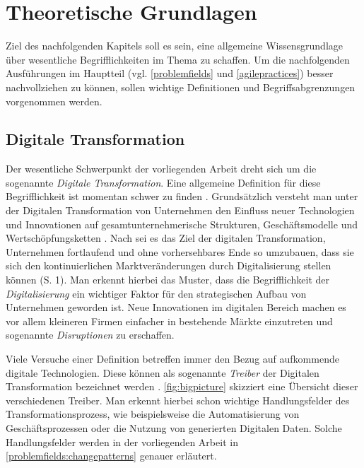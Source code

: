 \chapter{Theoretische Grundlagen}
\label{background}


Ziel des nachfolgenden Kapitels soll es sein, eine allgemeine Wissensgrundlage über wesentliche Begrifflichkeiten im Thema zu schaffen. Um die nachfolgenden Ausführungen im Hauptteil (vgl. \ref{problemfields} und \ref{agilepractices}) besser nachvollziehen zu können, sollen wichtige Definitionen und Begriffsabgrenzungen vorgenommen werden.

\section{Digitale Transformation}
\label{background:dt}

Der wesentliche Schwerpunkt der vorliegenden Arbeit dreht sich um die sogenannte \textit{Digitale Transformation}. Eine allgemeine Definition für diese Begrifflichkeit ist momentan schwer zu finden \cite[S. 3]{schallmo_digitale_2017}. Grundsätzlich versteht man unter der Digitalen Transformation von Unternehmen den Einfluss neuer Technologien und Innovationen auf gesamtunternehmerische Strukturen, Geschäftsmodelle und Wertschöpfungsketten \cite{oswald_digitale_2018}. Nach  sei es das Ziel der digitalen Transformation, Unternehmen fortlaufend und ohne vorhersehbares Ende so umzubauen, dass sie sich den kontinuierlichen Marktveränderungen durch Digitalisierung stellen können (S. 1). Man erkennt hierbei das Muster, dass die Begrifflichkeit der \textit{Digitalisierung} ein wichtiger Faktor für den strategischen Aufbau von Unternehmen geworden ist. Neue Innovationen im digitalen Bereich machen es vor allem kleineren Firmen einfacher in bestehende Märkte einzutreten und sogenannte \textit{Disruptionen}  zu erschaffen. 
 
 
 Viele Versuche einer Definition betreffen immer den Bezug auf aufkommende digitale Technologien. Diese können als sogenannte \textit{Treiber} der Digitalen Transformation bezeichnet werden \cite[S.20]{bloching_digitale_2015}. \ref{fig:bigpicture} skizziert eine Übersicht dieser verschiedenen Treiber. Man erkennt hierbei schon wichtige Handlungsfelder des Transformationsprozess, wie beispielsweise die Automatisierung von Geschäftsprozessen oder die Nutzung von generierten Digitalen Daten. Solche Handlungsfelder werden in der vorliegenden Arbeit in \ref{problemfields:changepatterns} genauer erläutert.
 
